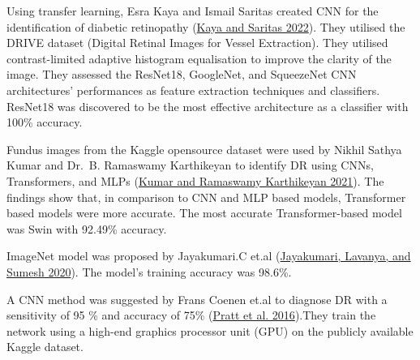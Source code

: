 \documentclass[
]{article}
\begin{document}
Using transfer learning, Esra Kaya and Ismail Saritas created CNN for
the identification of diabetic retinopathy
(\protect\hyperlink{ref-9828576}{Kaya and Saritas 2022}). They utilised
the DRIVE dataset (Digital Retinal Images for Vessel Extraction). They
utilised contrast-limited adaptive histogram equalisation to improve the
clarity of the image. They assessed the ResNet18, GoogleNet, and
SqueezeNet CNN architectures' performances as feature extraction
techniques and classifiers. ResNet18 was discovered to be the most
effective architecture as a classifier with 100\% accuracy.

Fundus images from the Kaggle opensource dataset were used by Nikhil
Sathya Kumar and Dr.~B. Ramaswamy Karthikeyan to identify DR using CNNs,
Transformers, and MLPs (\protect\hyperlink{ref-9651024}{Kumar and
Ramaswamy Karthikeyan 2021}). The findings show that, in comparison to
CNN and MLP based models, Transformer based models were more accurate.
The most accurate Transformer-based model was Swin with 92.49\%
accuracy.

ImageNet model was proposed by Jayakumari.C et.al
(\protect\hyperlink{ref-9215270}{Jayakumari, Lavanya, and Sumesh 2020}).
The model's training accuracy was 98.6\%.

A CNN method was suggested by Frans Coenen et.al to diagnose DR with a
sensitivity of 95 \% and accuracy of 75\%
(\protect\hyperlink{ref-pratt2016convolutional}{Pratt et al. 2016}).They
train the network using a high-end graphics processor unit (GPU) on the
publicly available Kaggle dataset.

\newpage
\end{document}
